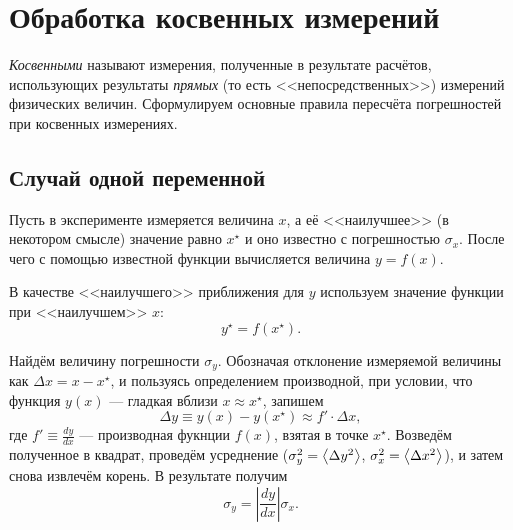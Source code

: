\section{Обработка косвенных измерений\label{sec:kosv}}

\emph{Косвенными} называют измерения, полученные в результате расчётов,
использующих результаты \emph{прямых} (то есть <<непосредственных>>)
измерений физических величин. Сформулируем основные правила пересчёта
погрешностей при косвенных измерениях.

\subsection{Случай одной переменной}

Пусть в эксперименте измеряется величина $x$, а её <<наилучшее>>
(в некотором смысле) значение равно $x^{\star}$ и оно известно с
погрешностью $\sigma_{x}$. После чего с помощью известной функции
вычисляется величина $y=f\!\left(x\right)$.

В качестве <<наилучшего>> приближения для $y$ используем значение функции
при <<наилучшем>> $x$:
\[
y^{\star}=f\!\left(x^{\star}\right).
\]

Найдём величину погрешности $\sigma_{y}$. Обозначая отклонение измеряемой
величины как $\Delta x=x-x^{\star}$, и пользуясь определением производной,
при условии, что функция $y\left(x\right)$ --- гладкая
вблизи $x\approx x^{\star}$, запишем
\[
\Delta y\equiv y\left(x\right)-y\left(x^{\star}\right)\approx f'\cdot\Delta x,
\]
где $f'\equiv\frac{dy}{dx}$ --- производная фукнции $f(x)$, взятая в точке
$x^{\star}$. Возведём полученное в квадрат, проведём усреднение
($\sigma_{y}^{2}=\left<\Delta y^{2}\right>$,
$\sigma_{x}^{2}=\left<\Delta x^{2}\right>$), и затем снова извлечём
корень. В результате получим
\begin{equation}
\boxed{{\sigma_{y}=\left|\frac{dy}{dx}\right|\sigma_{x}.}}\label{eq:sxy}
\end{equation}




